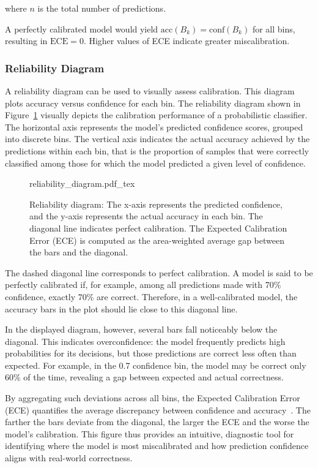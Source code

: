 where \( n \) is the total number of predictions.

A perfectly calibrated model would yield \( \text{acc}(B_k) = \text{conf}(B_k) \) for all bins, resulting in \( \text{ECE} = 0 \). Higher values of ECE indicate greater miscalibration.

\subsubsection{Reliability Diagram}
A reliability diagram can be used to visually assess calibration. This diagram plots accuracy versus confidence for each bin. The reliability diagram shown in Figure~\ref{fig:reliability} visually depicts the calibration performance of a probabilistic classifier. The horizontal axis represents the model's predicted confidence scores, grouped into discrete bins. The vertical axis indicates the actual accuracy achieved by the predictions within each bin, that is the proportion of samples that were correctly classified among those for which the model predicted a given level of confidence.

\begin{figure}[h]
	\centering
    \def\svgwidth{220pt}
 	{reliability_diagram.pdf_tex} 	 	
	\caption[Reliability diagram]{Reliability diagram: The x-axis represents the predicted confidence, and the y-axis represents the actual accuracy in each bin. The diagonal line indicates perfect calibration. The Expected Calibration Error (ECE) is computed as the area-weighted average gap between the bars and the diagonal.}
	\label{fig:reliability}
\end{figure}

The dashed diagonal line corresponds to perfect calibration. A model is said to be perfectly calibrated if, for example, among all predictions made with 70\% confidence, exactly 70\% are correct. Therefore, in a well-calibrated model, the accuracy bars in the plot should lie close to this diagonal line.

In the displayed diagram, however, several bars fall noticeably below the diagonal. This indicates overconfidence: the model frequently predicts high probabilities for its decisions, but those predictions are correct less often than expected. For example, in the 0.7 confidence bin, the model may be correct only 60\% of the time, revealing a gap between expected and actual correctness.

By aggregating such deviations across all bins, the Expected Calibration Error (ECE) quantifies the average discrepancy between confidence and accuracy~\cite{ece}. The farther the bars deviate from the diagonal, the larger the ECE and the worse the model's calibration. This figure thus provides an intuitive, diagnostic tool for identifying where the model is most miscalibrated and how prediction confidence aligns with real-world correctness.